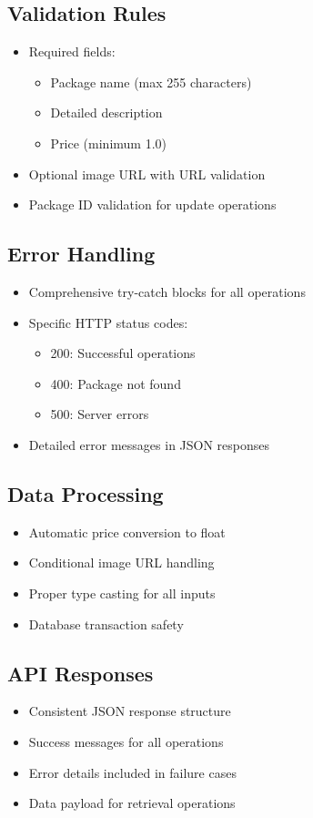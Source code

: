 \subsection{Validation Rules}
\begin{itemize}
    \item Required fields:
    \begin{itemize}
        \item Package name (max 255 characters)
        \item Detailed description
        \item Price (minimum 1.0)
    \end{itemize}
    \item Optional image URL with URL validation
    \item Package ID validation for update operations
\end{itemize}

\subsection{Error Handling}
\begin{itemize}
    \item Comprehensive try-catch blocks for all operations
    \item Specific HTTP status codes:
    \begin{itemize}
        \item 200: Successful operations
        \item 400: Package not found
        \item 500: Server errors
    \end{itemize}
    \item Detailed error messages in JSON responses
\end{itemize}

\subsection{Data Processing}
\begin{itemize}
    \item Automatic price conversion to float
    \item Conditional image URL handling
    \item Proper type casting for all inputs
    \item Database transaction safety
\end{itemize}

\subsection{API Responses}
\begin{itemize}
    \item Consistent JSON response structure
    \item Success messages for all operations
    \item Error details included in failure cases
    \item Data payload for retrieval operations
\end{itemize}

